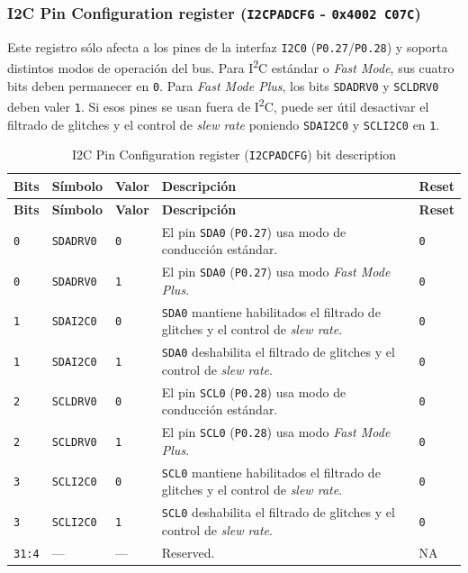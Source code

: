 \subsubsection{I2C Pin Configuration register (\texttt{I2CPADCFG} - \texttt{0x4002 C07C})}
Este registro sólo afecta a los pines de la interfaz \texttt{I2C0} (\texttt{P0.27}/\texttt{P0.28}) y soporta distintos modos de operación del bus. Para I\textsuperscript{2}C estándar o \textit{Fast Mode}, sus cuatro bits deben permanecer en \texttt{0}. Para \textit{Fast Mode Plus}, los bits \texttt{SDADRV0} y \texttt{SCLDRV0} deben valer \texttt{1}. Si esos pines se usan fuera de I\textsuperscript{2}C, puede ser útil desactivar el filtrado de glitches y el control de \textit{slew rate} poniendo \texttt{SDAI2C0} y \texttt{SCLI2C0} en \texttt{1}.

\begin{longtable}{|>{\raggedright\arraybackslash}p{}|>{\raggedright\arraybackslash}p{}|>{\raggedright\arraybackslash}p{}|>{\raggedright\arraybackslash}p{}|>{\centering\arraybackslash}p{}|}
\caption{I2C Pin Configuration register (\texttt{I2CPADCFG}) bit description}\\
\hline
\textbf{Bits} & \textbf{Símbolo} & \textbf{Valor} & \textbf{Descripción} & \textbf{Reset} \\
\hline
\endfirsthead
\hline
\textbf{Bits} & \textbf{Símbolo} & \textbf{Valor} & \textbf{Descripción} & \textbf{Reset} \\
\hline
\endhead
\texttt{0} & \texttt{SDADRV0} & \texttt{0} & El pin \texttt{SDA0} (\texttt{P0.27}) usa modo de conducción estándar. & \texttt{0} \\
\hline
\texttt{0} & \texttt{SDADRV0} & \texttt{1} & El pin \texttt{SDA0} (\texttt{P0.27}) usa modo \textit{Fast Mode Plus}. & \texttt{0} \\
\hline
\texttt{1} & \texttt{SDAI2C0} & \texttt{0} & \texttt{SDA0} mantiene habilitados el filtrado de glitches y el control de \textit{slew rate}. & \texttt{0} \\
\hline
\texttt{1} & \texttt{SDAI2C0} & \texttt{1} & \texttt{SDA0} deshabilita el filtrado de glitches y el control de \textit{slew rate}. & \texttt{0} \\
\hline
\texttt{2} & \texttt{SCLDRV0} & \texttt{0} & El pin \texttt{SCL0} (\texttt{P0.28}) usa modo de conducción estándar. & \texttt{0} \\
\hline
\texttt{2} & \texttt{SCLDRV0} & \texttt{1} & El pin \texttt{SCL0} (\texttt{P0.28}) usa modo \textit{Fast Mode Plus}. & \texttt{0} \\
\hline
\texttt{3} & \texttt{SCLI2C0} & \texttt{0} & \texttt{SCL0} mantiene habilitados el filtrado de glitches y el control de \textit{slew rate}. & \texttt{0} \\
\hline
\texttt{3} & \texttt{SCLI2C0} & \texttt{1} & \texttt{SCL0} deshabilita el filtrado de glitches y el control de \textit{slew rate}. & \texttt{0} \\
\hline
\texttt{31:4} & --- & --- & Reserved. & NA \\
\hline
\end{longtable}

\normalsize
